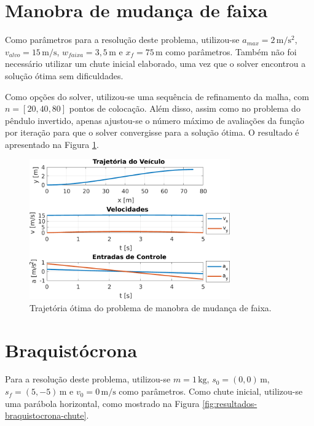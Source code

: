 \section{Manobra de mudança de faixa}
\label{sec:resultados-manobra-mudanca-faixa}

Como parâmetros para a resolução deste problema, utilizou-se $a_{max}=2 \, \si{\meter\per\second\squared}$, $v_{alvo}=15 \, \si{\meter\per\second}$, $w_{faixa}=3,5 \, \si{\meter}$ e $x_f=75 \, \si{\meter}$ como parâmetros. Também não foi necessário utilizar um chute inicial elaborado, uma vez que o solver encontrou a solução ótima sem dificuldades.

Como opções do solver, utilizou-se uma sequência de refinamento da malha, com $n=[20, 40, 80]$ pontos de colocação. Além disso, assim como no problema do pêndulo invertido, apenas ajustou-se o número máximo de avaliações da função por iteração para que o solver convergisse para a solução ótima. O resultado é apresentado na Figura \ref{fig:resultados-manobra-mudanca-faixa}.

\begin{figure}[H]
    \centering
    \includegraphics[width=0.77\textwidth]{Cap4/figuras/manobra-mudanca-faixa.pdf}
    \caption{Trajetória ótima do problema de manobra de mudança de faixa.}
    \label{fig:resultados-manobra-mudanca-faixa}
\end{figure}

\section{Braquistócrona}
\label{sec:resultados-braquistocrona}

Para a resolução deste problema, utilizou-se $m=1 \, \si{\kilo\gram}$, $s_{0}=(0,0) \, \si{\meter}$, $s_{f}=(5,-5) \, \si{\meter}$ e $v_0=0 \, \si{\meter\per\second}$ como parâmetros. Como chute inicial, utilizou-se uma parábola horizontal, como mostrado na Figura \ref{fig:resultados-braquistocrona-chute}.

